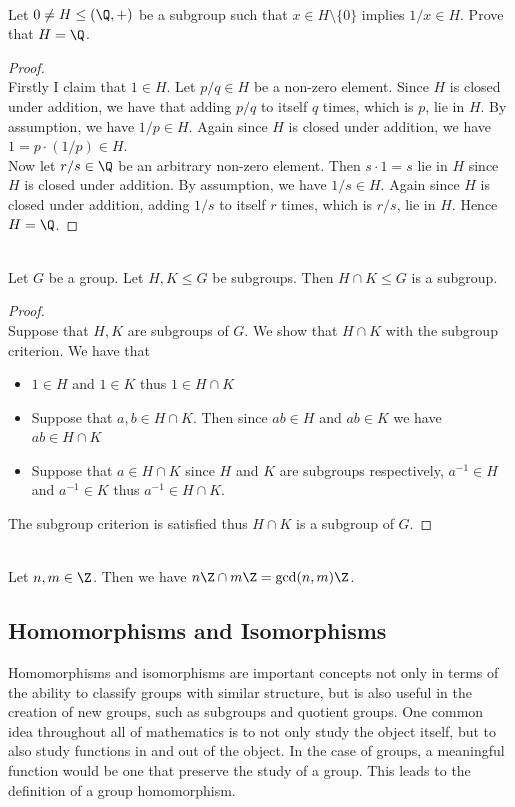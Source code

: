 \documentclass[a4paper]{article}
\begin{document}
\begin{eg}{}{}\\
Let $0\neq H\leq(\Q,+)$ be a subgroup such that $x\in H\setminus\{0\}$ implies $1/x\in H$. Prove that $H=\Q$. 
\begin{proof}\\
Firstly I claim that $1\in H$. Let $p/q\in H$ be a non-zero element. Since $H$ is closed under addition, we have that adding $p/q$ to itself $q$ times, which is $p$, lie in $H$. By assumption, we have $1/p\in H$. Again since $H$ is closed under addition, we have $1=p\cdot (1/p)\in H$. \\

Now let $r/s\in\Q$ be an arbitrary non-zero element. Then $s\cdot 1=s$ lie in $H$ since $H$ is closed under addition. By assumption, we have $1/s\in H$. Again since $H$ is closed under addition, adding $1/s$ to itself $r$ times, which is $r/s$, lie in $H$. Hence $H=\Q$. 
\end{proof}
\end{eg}

\begin{prp}{}{}\\
Let $G$ be a group. Let $H,K\leq G$ be subgroups. Then $H\cap K\leq G$ is a subgroup. 
\begin{proof}\\
Suppose that $H,K$ are subgroups of $G$. We show that $H\cap K$ with the subgroup criterion. We have that 
\begin{itemize}
\item $1\in H$ and $1\in K$ thus $1\in H\cap K$
\item Suppose that $a,b\in H\cap K$. Then since $ab\in H$ and $ab\in K$ we have $ab\in H\cap K$
\item Suppose that $a\in H\cap K$ since $H$ and $K$ are subgroups respectively, $a^{-1}\in H$ and $a^{-1}\in K$ thus $a^{-1}\in H\cap K$. 
\end{itemize}
The subgroup criterion is satisfied thus $H\cap K$ is a subgroup of $G$. 
\end{proof}
\end{prp}

\begin{eg}{}{}\\
Let $n,m\in\Z$. Then we have $n\Z\cap m\Z=\gcd(n,m)\Z$. 
\end{eg}

\subsection{Homomorphisms and Isomorphisms}
Homomorphisms and isomorphisms are important concepts not only in terms of the ability to classify groups with similar structure, but is also useful in the creation of new groups, such as subgroups and quotient groups. One common idea throughout all of mathematics is to not only study the object itself, but to also study functions in and out of the object. In the case of groups, a meaningful function would be one that preserve the study of a group. This leads to the definition of a group homomorphism. 
\end{document}
